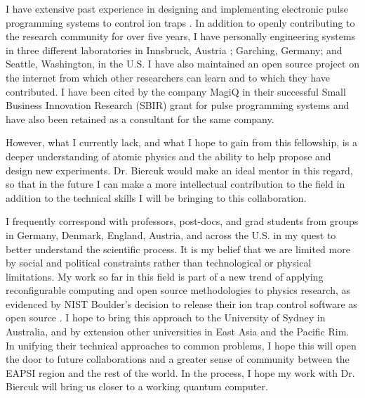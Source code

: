 \documentclass{article}
\begin{document}
I have extensive past experience in
designing and implementing electronic pulse programming systems to control
ion traps \cite{Pham2005} \cite{Petersen2007} \cite{Schindler2008}.
In addition to openly contributing
to the research community for over five years, I have personally
engineering systems in three different laboratories in Innsbruck, Austria
\cite{Riebe2006}; Garching, Germany; and Seattle, Washington, in the U.S.
I have also maintained an open source project on the internet
\cite{pp2005}
from which other
researchers can learn and to which they have contributed. I have
been cited by the company MagiQ in their successful
Small Business Innovation Research (SBIR)
grant for pulse programming systems \cite{MagiQ2007}
and have also been retained as a consultant for the same company.

However, what I currently lack, and what I hope to gain from this fellowship,
is a deeper understanding of atomic physics and the ability to help propose
and design new experiments. Dr. Biercuk would make an ideal mentor in this
regard, so that in the future I can make a more intellectual contribution to
the field in addition to the technical skills I will be bringing to this
collaboration.

I
frequently correspond with professors, post-docs, and grad students from groups
in Germany, Denmark, England, Austria, and across the U.S. in my quest to
better understand the scientific process. It is my belief that we are limited
more by social and political constraints rather than technological or physical
limitations. My work so far in this field is part of a
new trend of applying reconfigurable computing and open source
methodologies to physics research, as evidenced by NIST Boulder's decision
to release their ion trap control software as open source \cite{ionizer2010}.
I hope to bring this approach to the University of Sydney in Australia,
and by extension other universities in East Asia and the Pacific Rim. In
unifying their technical approaches to common problems, I hope this will open
the door to future collaborations and a greater sense of community between
the EAPSI region and the rest of the world. In the process, I hope my work
with Dr. Biercuk will bring us closer to a working quantum computer.



\end{document}
